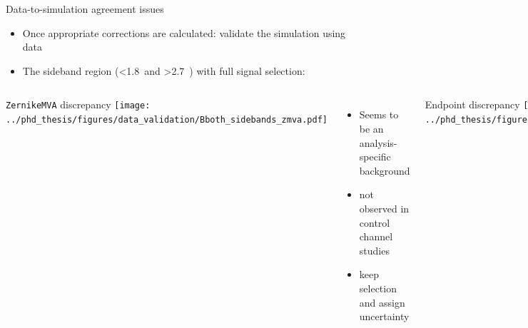 \documentclass[xcolor=dvipsnames]{beamer}
\begin{document}



\begin{frame}{Data-to-simulation agreement issues}
   \scriptsize\centering
   \begin{itemize}
      \item Once appropriate corrections are calculated: validate the simulation using data
      \item The sideband region (\EB<1.8~\gev and \EB>2.7~\gev) with full signal selection:
   \end{itemize}

   \vspace{5pt}

   \begin{columns}[t]
      \centering
      \texttt{ZernikeMVA} discrepancy
      \texttt{[image: ../phd\_thesis/figures/data\_validation/Bboth\_sidebands\_zmva.pdf]}
      
      \begin{itemize}
         \item Seems to be an analysis-specific background
         \item[\ra] not observed in control channel studies
         \item[\ra] keep selection and assign uncertainty   
      \end{itemize}
      
      \centering
      \Mbc Endpoint discrepancy
      \texttt{[image: ../phd\_thesis/figures/data\_validation/sidebands\_mbc\_nozmva\_1.pdf]}
      \begin{itemize}
         \item Related to the fact that data-taking period independent simulation used
         \item[\ra] correction and uncertainty applied
      \end{itemize}
  
   \end{columns}

\end{frame}
\end{document}
